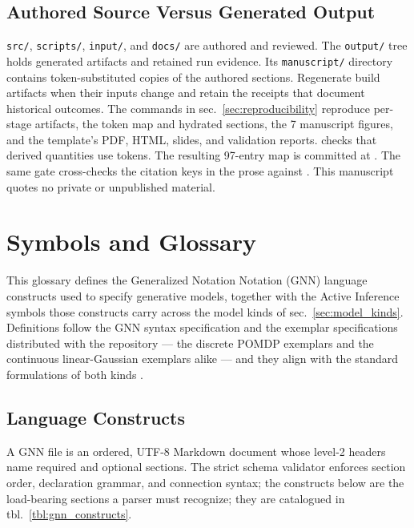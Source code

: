 \documentclass[
  english,
  9pt,
]{extarticle}
\begin{document}
\subsection{Authored Source Versus Generated
Output}\label{authored-source-versus-generated-output}

\texttt{src/}, \texttt{scripts/}, \texttt{input/}, and \texttt{docs/}
are authored and reviewed. The \texttt{output/} tree holds generated
artifacts and retained run evidence. Its \texttt{manuscript/} directory
contains token-substituted copies of the authored
 sections. Regenerate build artifacts when
their inputs change and retain the receipts that document historical
outcomes. The commands in sec.~\ref{sec:reproducibility} reproduce
per-stage artifacts, the token map and hydrated sections, the 7
manuscript figures, and the template's PDF, HTML, slides, and validation
reports.  checks that
derived quantities use tokens. The resulting 97-entry map is committed
at . The same gate
cross-checks the citation keys in the prose against
. This manuscript quotes no
private or unpublished material.

\newpage

\section{Symbols and Glossary}\label{sec:symbols_glossary}

This glossary defines the Generalized Notation Notation (GNN) language
constructs used to specify generative models, together with the Active
Inference symbols those constructs carry across the model kinds of
sec.~\ref{sec:model_kinds}. Definitions follow the GNN syntax
specification and the exemplar specifications distributed with the
repository --- the discrete POMDP exemplars and the continuous
linear-Gaussian exemplars alike --- and they align with the standard
formulations of both kinds \citep{gnn2023, dacosta2020, parr2022}.

\subsection{Language Constructs}\label{language-constructs}

A GNN file is an ordered, UTF-8 Markdown document whose level-2 headers
name required and optional sections. The strict schema validator
enforces section order, declaration grammar, and connection syntax; the
constructs below are the load-bearing sections a parser must recognize;
they are catalogued in tbl.~\ref{tbl:gnn_constructs}.
\end{document}
